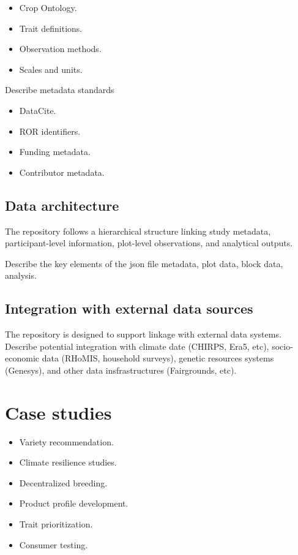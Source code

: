 \documentclass[3p]{elsarticle} %
\providecommand{\tightlist}{%
  \setlength{\itemsep}{0pt}\setlength{\parskip}{0pt}}
\begin{document}
\begin{itemize}
\tightlist
\item
  Crop Ontology.
\item
  Trait definitions.
\item
  Observation methods.
\item
  Scales and units.
\end{itemize}

Describe metadata standards

\begin{itemize}
\tightlist
\item
  DataCite.
\item
  ROR identifiers.
\item
  Funding metadata.
\item
  Contributor metadata.
\end{itemize}

\subsection{Data architecture}\label{data-architecture}

The repository follows a hierarchical structure linking study metadata,
participant-level information, plot-level observations, and analytical
outputs.

Describe the key elements of the json file metadata, plot data, block
data, analysis.

\subsection{Integration with external data
sources}\label{integration-with-external-data-sources}

The repository is designed to support linkage with external data
systems. Describe potential integration with climate date (CHIRPS, Era5,
etc), socio-economic data (RHoMIS, household surveys), genetic resources
systems (Genesys), and other data insfrastructures (Fairgrounds, etc).

\section{Case studies}\label{case-studies}

\begin{itemize}
\tightlist
\item
  Variety recommendation.
\item
  Climate resilience studies.
\item
  Decentralized breeding.
\item
  Product profile development.
\item
  Trait prioritization.
\item
  Consumer testing.
\end{itemize}
\end{document}
